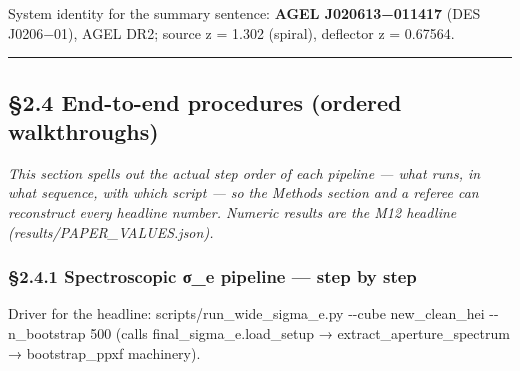 \documentclass[
]{article}
\newcommand{\BreakablePath}[1]{{\ttfamily\sloppy #1}}
\begin{document}
System identity for the summary sentence: \textbf{AGEL J020613−011417}
(DES J0206−01), AGEL DR2; source z = 1.302 (spiral), deflector z =
0.67564.

\begin{center}\rule{0.5\linewidth}{0.5pt}\end{center}

\hypertarget{end-to-end-procedures-ordered-walkthroughs}{%
\subsection{§2.4 End-to-end procedures (ordered
walkthroughs)}\label{end-to-end-procedures-ordered-walkthroughs}}

\emph{This section spells out the actual step order of each pipeline ---
what runs, in what sequence, with which script --- so the Methods
section and a referee can reconstruct every headline number. Numeric
results are the M12 headline
(\BreakablePath{results/\discretionary{}{}{}PAPER\_\discretionary{}{}{}VALUES.\discretionary{}{}{}json}).}

\hypertarget{spectroscopic-ux3c3_e-pipeline-step-by-step}{%
\subsubsection{§2.4.1 Spectroscopic σ\_e pipeline --- step by
step}\label{spectroscopic-ux3c3_e-pipeline-step-by-step}}

Driver for the headline:
\BreakablePath{scripts/\discretionary{}{}{}run\_\discretionary{}{}{}wide\_\discretionary{}{}{}sigma\_\discretionary{}{}{}e.\discretionary{}{}{}py -\discretionary{}{}{}-\discretionary{}{}{}cube new\_\discretionary{}{}{}clean\_\discretionary{}{}{}hei -\discretionary{}{}{}-\discretionary{}{}{}n\_\discretionary{}{}{}bootstrap 500}
(calls
\BreakablePath{final\_\discretionary{}{}{}sigma\_\discretionary{}{}{}e.\discretionary{}{}{}load\_\discretionary{}{}{}setup}
→
\BreakablePath{extract\_\discretionary{}{}{}aperture\_\discretionary{}{}{}spectrum}
→ \BreakablePath{bootstrap\_\discretionary{}{}{}ppxf} machinery).
\end{document}
